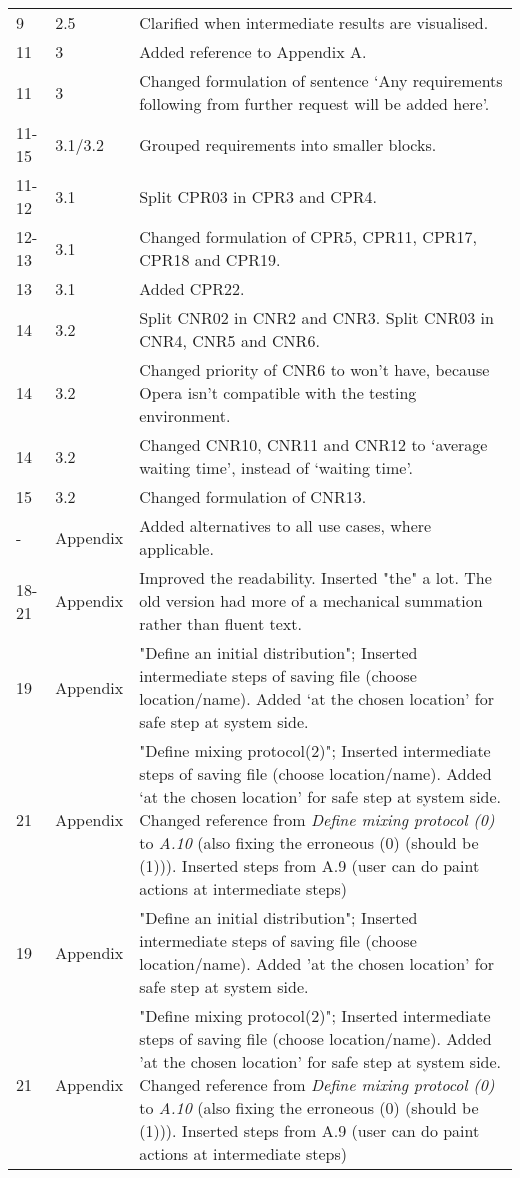 \begin{longtable}{|l|l|p{11cm}|}
    9 & 2.5 & Clarified when intermediate results are visualised. \\
    11 & 3 & Added reference to Appendix A.\\
    11 & 3 & Changed formulation of sentence `Any requirements following from further request will be added here'.\\
    11-15 & 3.1/3.2 & Grouped requirements into smaller blocks.\\
    11-12 & 3.1 & Split CPR03 in CPR3 and CPR4.\\
    12-13 & 3.1 & Changed formulation of CPR5, CPR11, CPR17, CPR18 and CPR19.\\
    13 & 3.1 & Added CPR22.\\
    14 & 3.2 & Split CNR02 in CNR2 and CNR3. Split CNR03 in CNR4, CNR5 and CNR6.\\
    14 & 3.2 & Changed priority of CNR6 to won't have, because Opera isn't compatible with the testing environment.\\
    14 & 3.2 & Changed CNR10, CNR11 and CNR12 to `average waiting time', instead of `waiting time'.\\
    15 & 3.2 & Changed formulation of CNR13.\\
    - & Appendix & Added alternatives to all use cases, where applicable.\\
    18-21 & Appendix & Improved the readability. Inserted "the" a lot. The old version had more of a mechanical summation rather than fluent text.\\
    19 & Appendix & "Define an initial distribution"; Inserted intermediate steps of saving file (choose location/name). Added `at the chosen location' for safe step at system side.\\
    21 & Appendix & "Define mixing protocol(2)"; Inserted intermediate steps of saving file (choose location/name). Added `at the chosen location' for safe step at system side. Changed reference from \emph{Define mixing protocol (0)} to \emph{A.10} (also fixing the erroneous (0) (should be (1))). Inserted steps from A.9 (user can do paint actions at intermediate steps) \\
    19 & Appendix & "Define an initial distribution"; Inserted intermediate steps of saving file (choose location/name). Added 'at the chosen location' for safe step at system side.\\
    21 & Appendix & "Define mixing protocol(2)"; Inserted intermediate steps of saving file (choose location/name). Added 'at the chosen location' for safe step at system side. Changed reference from \emph{Define mixing protocol (0)} to \emph{A.10} (also fixing the erroneous (0) (should be (1))). Inserted steps from A.9 (user can do paint actions at intermediate steps) \\

\end{longtable}
